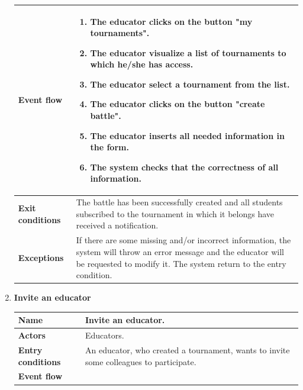 \begin{enumerate}[label=\textbf{UC.\arabic*}]
\begin{table}[H]
\begin{tabular}{|m{3.2cm}|m{9.8cm}|}
                    \hline
                    \textbf{Event flow}  & 
                    \begin{enumerate}[label=\arabic*.]
                        \item The educator clicks on the button "my tournaments".
                        \item The educator visualize a list of tournaments to which he/she has access.
                        \item The educator select a tournament from the list.
                        \item The educator clicks on the button "create battle".
                        \item The educator inserts all needed information in the form.
                        \item The system checks that the correctness of all information.
                    \end{enumerate}\\
                    \hline
                    \textbf{Exit conditions}  & The battle has been successfully created and all students subscribed to the tournament in which it belongs have received a notification.  \\
                    \hline
                    \textbf{Exceptions}  &  If there are some missing and/or incorrect information, the system will throw an error message and the educator will be requested to modify it.  The system return to the entry condition. \\
                    \hline 
                \end{tabular}
        \end{table}
        \item {} \textbf{Invite an educator}
        \begin{table}[H]
    	    \centering
                \renewcommand{\arraystretch}{1.5}
                \begin{tabular}{|m{3.2cm}|m{9.8cm}|}
                    \hline
                    \textbf{Name} & Invite an educator. \\
                    \hline
                    \textbf{Actors} & Educators. \\
                    \hline
                    \textbf{Entry conditions}  & An educator, who created a tournament, wants to invite some colleagues to participate. \\
                    \hline
                    \textbf{Event flow}  & 

\end{tabular}
\end{table}
\end{enumerate}
